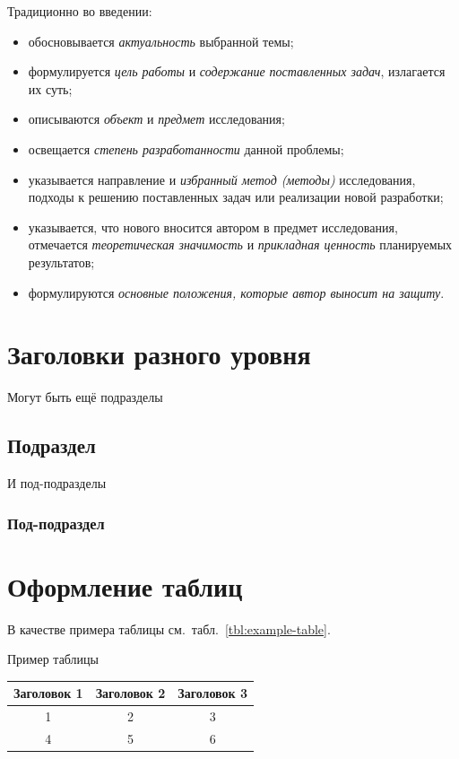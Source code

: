 \documentclass[PI,VKR]{HSEUniversity}
\begin{document}
Традиционно во введении:
\begin{itemize}
	\item  обосновывается \emph{актуальность} выбранной темы;
	\item  формулируется \emph{цель работы} и \emph{содержание поставленных задач}, излагается их суть;
	\item  описываются \emph{объект} и \emph{предмет} исследования;
	\item  освещается \emph{степень разработанности} данной проблемы;
	\item  указывается направление и \emph{избранный метод (методы)} исследования, подходы к решению поставленных задач или реализации новой разработки;
	\item  указывается, что нового вносится автором в предмет исследования, отмечается \emph{теоретическая значимость} и \emph{прикладная ценность} планируемых результатов;
	\item  формулируются \emph{основные положения, которые автор выносит на защиту}.
\end{itemize}

\section{Заголовки разного уровня}

\lipsum[2]

Могут быть ещё подразделы

\subsection{Подраздел}

\lipsum[2]

И под-подразделы

\subsubsection{Под-подраздел}
\lipsum[2]

\section{Оформление таблиц} 
%
В качестве примера таблицы см.~табл.~\ref{tbl:example-table}.

\begin{TABLE}[H]{Пример таблицы\label{tbl:example-table}}
	\begin{tabular}{c|cc}
		\hline\hline %
		Заголовок 1 & Заголовок 2 & Заголовок 3 \\ 
		\hline %
		1 & 2 & 3 \\
		4 & 5 & 6 \\
		\hline\hline %
	\end{tabular}
\end{TABLE}
\end{document}
